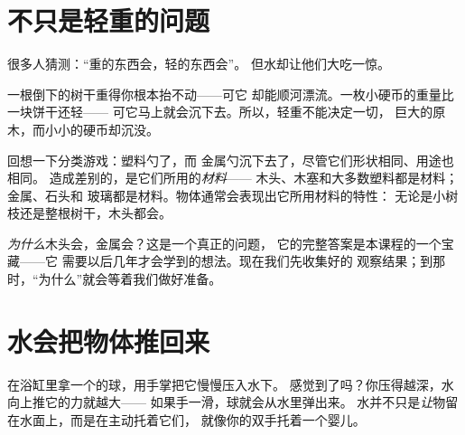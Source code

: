 \section{不只是轻重的问题}

很多人猜测：“重的东西会，轻的东西会”。
但水却让他们大吃一惊。

\begin{example}[原木与硬币]\label{ex:g1:floating-and-sinking:log}
一根倒下的树干重得你根本抬不动——可它
却能顺河漂流。一枚小硬币的重量比一块饼干还轻——
可它马上就会沉下去。所以，轻重不能决定一切，
巨大的原木，而小小的硬币却沉没。
\end{example}

\begin{example}[起作用的是材料]\label{ex:g1:floating-and-sinking:stuff}
回想一下分类游戏：塑料勺了，而
金属勺沉下去了，尽管它们形状相同、用途也相同。
造成差别的，是它们所用的\emph{材料}——
木头、木塞和大多数塑料都是材料；金属、石头和
玻璃都是材料。物体通常会表现出它所用材料的特性：
无论是小树枝还是整根树干，木头都会。
\end{example}

\begin{remark}[一点小小的疑问]\label{rem:g1:floating-and-sinking:why}
\emph{为什么}木头会，金属会？这是一个真正的问题，
它的完整答案是本课程的一个宝藏——它
需要以后几年才会学到的想法。现在我们先收集好的
观察结果；到那时，“为什么”就会等着我们做好准备。
\end{remark}

\section{水会把物体推回来}

\begin{example}\label{ex:g1:floating-and-sinking:push}
在浴缸里拿一个的球，用手掌把它慢慢压入水下。
感觉到了吗？你压得越深，水向上推它的力就越大——
如果手一滑，球就会从水里弹出来。
水并不只是\emph{让}物留在水面上，而是在主动托着它们，
就像你的双手托着一个婴儿。
\end{example}

